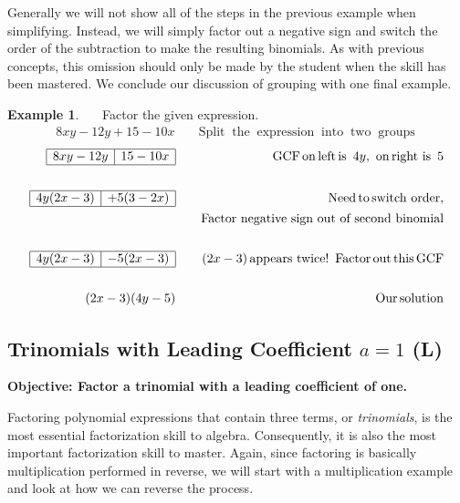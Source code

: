 \documentclass[12pt]{book}
\theoremstyle{definition}
\newtheorem{example}{Example}
\newcommand{\tmop}[1]{\ensuremath{\operatorname{#1}}}
\begin{document}
Generally we will not show all of the steps in the previous example when simplifying.  Instead, we will simply factor out a negative sign and switch the order of the subtraction to make the resulting binomials.  As with previous concepts, this omission should only be made by the student when the skill has been mastered.  We conclude our discussion of grouping with one final example.

\begin{example}~~~Factor the given expression.
  \begin{eqnarray*}
    8 x y - 12 y + 15 - 10 x &  & \tmop{Split} \tmop{the} \tmop{expression}
    \tmop{into} \tmop{two} \tmop{groups}
  \end{eqnarray*}
	\begin{eqnarray*}
	\begin{array}{|l|l|}
      \hline
      8 x y - 12 y & 15 - 10 x\\
      \hline
    \end{array} &  & \tmop{GCF} \tmop{on} \tmop{left} \tmop{is~} 4 y, \tmop{~on}
    \tmop{right~is~} 5\\
&&\\
    \begin{array}{|l|l|}
      \hline
      4 y (2 x - 3) & + 5 (3 - 2 x)\\
      \hline
    \end{array} &  & \tmop{Need} \tmop{to} \tmop{switch~order},\\
		&& \text{~~~Factor~negative~sign~out~of~second~binomial}\\
&&\\
    \begin{array}{|l|l|}
      \hline
      4 y (2 x - 3) & - 5 (2 x - 3)\\
      \hline
    \end{array} &  & (2 x - 3) \tmop{appears~twice} !
    \tmop{~Factor} \tmop{out} \tmop{this} \tmop{GCF}\\
&&\\
    (2 x - 3) (4 y - 5) &  & \tmop{Our} \tmop{solution}
  \end{eqnarray*}
\end{example}
\subsection{Trinomials with Leading Coefficient $a=1$ (L)}
{\bf Objective: Factor a trinomial with a leading coefficient of one.}\par
Factoring polynomial expressions that contain three terms, or {\it trinomials}, is the most essential factorization skill to algebra.  Consequently, it is also the most important factorization skill to master.  Again, since factoring is basically multiplication performed in reverse, we will start with a multiplication example and look at how we can reverse the process.
\end{document}
